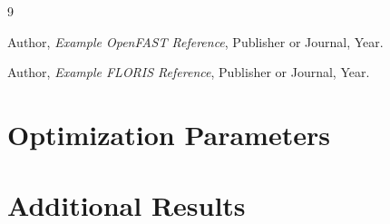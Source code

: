 \documentclass[11pt]{article}
\begin{document}

\begin{thebibliography}{9}

Author,
\textit{Example OpenFAST Reference},
Publisher or Journal,
Year.

Author,
\textit{Example FLORIS Reference},
Publisher or Journal,
Year.

\end{thebibliography}



\appendix

\section{Optimization Parameters}

\lipsum[25]

\section{Additional Results}

\lipsum[26]
\end{document}
